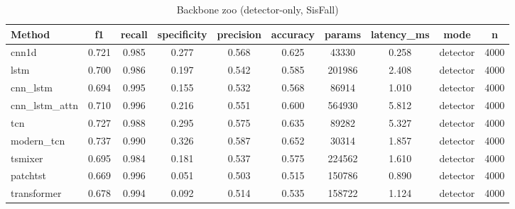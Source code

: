 \begin{table}[t]
\centering
\caption{Backbone zoo (detector-only, SisFall)}
\begin{tabular}{lccccccccc}
\toprule
Method & f1 & recall & specificity & precision & accuracy & params & latency_ms & mode & n \\
\midrule
cnn1d & 0.721 & 0.985 & 0.277 & 0.568 & 0.625 & 43330 & 0.258 & detector & 4000 \\
lstm & 0.700 & 0.986 & 0.197 & 0.542 & 0.585 & 201986 & 2.408 & detector & 4000 \\
cnn_lstm & 0.694 & 0.995 & 0.155 & 0.532 & 0.568 & 86914 & 1.010 & detector & 4000 \\
cnn_lstm_attn & 0.710 & 0.996 & 0.216 & 0.551 & 0.600 & 564930 & 5.812 & detector & 4000 \\
tcn & 0.727 & 0.988 & 0.295 & 0.575 & 0.635 & 89282 & 5.327 & detector & 4000 \\
modern_tcn & 0.737 & 0.990 & 0.326 & 0.587 & 0.652 & 30314 & 1.857 & detector & 4000 \\
tsmixer & 0.695 & 0.984 & 0.181 & 0.537 & 0.575 & 224562 & 1.610 & detector & 4000 \\
patchtst & 0.669 & 0.996 & 0.051 & 0.503 & 0.515 & 150786 & 0.890 & detector & 4000 \\
transformer & 0.678 & 0.994 & 0.092 & 0.514 & 0.535 & 158722 & 1.124 & detector & 4000 \\
\bottomrule
\end{tabular}
\end{table}